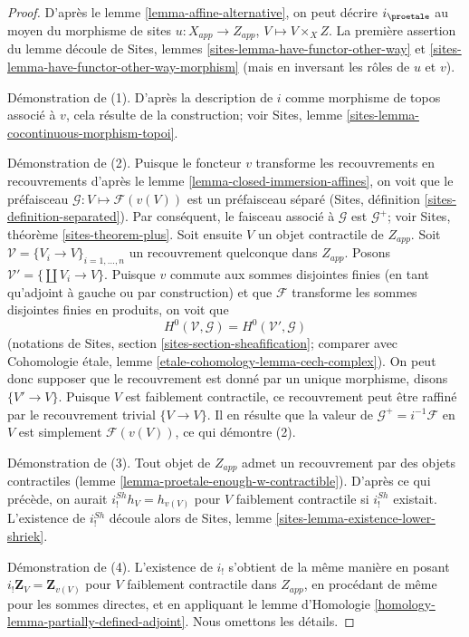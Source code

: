 \begin{proof}
D'après le lemme \ref{lemma-affine-alternative}, on peut décrire $i_\proetale$ au moyen
du morphisme de sites $u : X_{app} \to Z_{app}$, $V \mapsto V \times_X Z$.
La première assertion du lemme découle de
Sites, lemmes \ref{sites-lemma-have-functor-other-way} et
\ref{sites-lemma-have-functor-other-way-morphism}
(mais en inversant les rôles de $u$ et $v$).

\medskip\noindent
Démonstration de (1). D'après la description de $i$ comme morphisme de topos associé
à $v$, cela résulte de la construction; voir
Sites, lemme \ref{sites-lemma-cocontinuous-morphism-topoi}.

\medskip\noindent
Démonstration de (2). Puisque le foncteur $v$ transforme les recouvrements en recouvrements d'après le
lemme \ref{lemma-closed-immersion-affines}, on voit que le préfaisceau
$\mathcal{G} : V \mapsto \mathcal{F}(v(V))$ est un préfaisceau séparé
(Sites, définition \ref{sites-definition-separated}). Par conséquent,
le faisceau associé à $\mathcal{G}$ est $\mathcal{G}^+$; voir
Sites, théorème \ref{sites-theorem-plus}. Soit ensuite $V$ un objet
contractile de $Z_{app}$. Soit
$\mathcal{V} = \{V_i \to V\}_{i = 1, \ldots, n}$
un recouvrement quelconque dans $Z_{app}$. Posons $\mathcal{V}' = \{\coprod V_i \to V\}$.
Puisque $v$ commute aux sommes disjointes finies (en tant qu'adjoint à gauche ou par
construction) et que $\mathcal{F}$ transforme les sommes
disjointes finies en produits, on voit que
$$
H^0(\mathcal{V}, \mathcal{G}) = H^0(\mathcal{V}', \mathcal{G})
$$
(notations de Sites, section \ref{sites-section-sheafification};
comparer avec
Cohomologie \'etale, lemme \ref{etale-cohomology-lemma-cech-complex}).
On peut donc supposer que le recouvrement est donné par un unique morphisme, disons
$\{V' \to V\}$. Puisque $V$ est faiblement contractile, ce recouvrement
peut être raffiné par le recouvrement trivial $\{V \to V\}$.
Il en résulte que la valeur de $\mathcal{G}^+ = i^{-1}\mathcal{F}$
en $V$ est simplement $\mathcal{F}(v(V))$, ce qui démontre (2).

\medskip\noindent
Démonstration de (3). Tout objet de $Z_{app}$ admet un recouvrement par des objets
contractiles (lemme \ref{lemma-proetale-enough-w-contractible}).
D'après ce qui précède, on aurait $i^{Sh}_!h_V = h_{v(V)}$ pour $V$
faiblement contractile si $i^{Sh}_!$ existait. L'existence de
$i^{Sh}_!$ découle alors de
Sites, lemme \ref{sites-lemma-existence-lower-shriek}.

\medskip\noindent
Démonstration de (4). L'existence de $i_!$ s'obtient de la même manière en posant
$i_!\mathbf{Z}_V = \mathbf{Z}_{v(V)}$ pour $V$ faiblement contractile dans $Z_{app}$,
en procédant de même pour les sommes directes, et en appliquant le
lemme d'Homologie \ref{homology-lemma-partially-defined-adjoint}.
Nous omettons les détails.


\end{proof}
